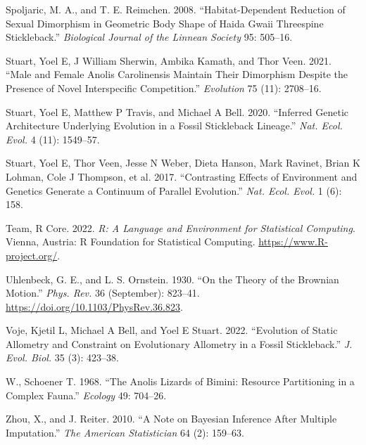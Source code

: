 \documentclass[
  12pt,
]{article}
\newlength{\cslhangindent}
\newlength{\cslentryspacingunit} %
\newenvironment{CSLReferences}[2] %
 {%
  \setlength{\parindent}{0pt}
  \ifodd #1
  \let\oldpar\par
  \def\par{\hangindent=\cslhangindent\oldpar}
  \fi
  \setlength{\parskip}{#2\cslentryspacingunit}
 }%
 {}
\begin{document}
\begin{CSLReferences}{1}{0}
\leavevmode{}%
Spoljaric, M. A., and T. E. Reimchen. 2008. {``Habitat-Dependent
Reduction of Sexual Dimorphism in Geometric Body Shape of Haida Gwaii
Threespine Stickleback.''} \emph{Biological Journal of the Linnean
Society} 95: 505--16.

\leavevmode{}%
Stuart, Yoel E, J William Sherwin, Ambika Kamath, and Thor Veen. 2021.
{``Male and Female Anolis Carolinensis Maintain Their Dimorphism Despite
the Presence of Novel Interspecific Competition.''} \emph{Evolution} 75
(11): 2708--16.

\leavevmode{}%
Stuart, Yoel E, Matthew P Travis, and Michael A Bell. 2020. {``Inferred
Genetic Architecture Underlying Evolution in a Fossil Stickleback
Lineage.''} \emph{Nat. Ecol. Evol.} 4 (11): 1549--57.

\leavevmode{}%
Stuart, Yoel E, Thor Veen, Jesse N Weber, Dieta Hanson, Mark Ravinet,
Brian K Lohman, Cole J Thompson, et al. 2017. {``Contrasting Effects of
Environment and Genetics Generate a Continuum of Parallel Evolution.''}
\emph{Nat. Ecol. Evol.} 1 (6): 158.

\leavevmode{}%
Team, R Core. 2022. \emph{R: A Language and Environment for Statistical
Computing}. Vienna, Austria: R Foundation for Statistical Computing.
\url{https://www.R-project.org/}.

\leavevmode{}%
Uhlenbeck, G. E., and L. S. Ornstein. 1930. {``On the Theory of the
Brownian Motion.''} \emph{Phys. Rev.} 36 (September): 823--41.
\url{https://doi.org/10.1103/PhysRev.36.823}.

\leavevmode{}%
Voje, Kjetil L, Michael A Bell, and Yoel E Stuart. 2022. {``Evolution of
Static Allometry and Constraint on Evolutionary Allometry in a Fossil
Stickleback.''} \emph{J. Evol. Biol.} 35 (3): 423--38.

\leavevmode{}%
W., Schoener T. 1968. {``The Anolis Lizards of Bimini: Resource
Partitioning in a Complex Fauna.''} \emph{Ecology} 49: 704--26.

\leavevmode{}%
Zhou, X., and J. Reiter. 2010. {``A Note on Bayesian Inference After
Multiple Imputation.''} \emph{The American Statistician} 64 (2):
159--63.

\end{CSLReferences}
\end{document}
